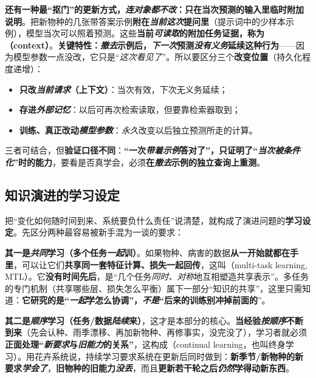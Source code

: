 \textbf{还有一种最“抠门”的更新方式，\emph{连对象都不改}：只在当次预测的输入里临时附加说明}。把新物种的几张带答案示例\textbf{附在\emph{当前这次}提问里}（提示词中的少样本示例），模型当次可以照着预测。这些\textbf{当前\emph{可读取}的附加任务证据，称为（context）}。\textbf{关键特性：\emph{撤去}示例后，\emph{下一次}预测\emph{没有义务}延续这种行为}——因为模型参数一点没改，它只是“\emph{这次看见了}”。所以要区分三个\textbf{改变位置}（持久化程度递增）：
\begin{itemize}\item \textbf{只改\emph{当前请求}（上下文）}：当次有效，下次无义务延续；\item \textbf{存进\emph{外部记忆}}：以后可再次检索读取，但要靠检索器取到；\item \textbf{训练、真正改动\emph{模型参数}}：\emph{永久}改变以后独立预测所走的计算。\end{itemize}
三者可结合，但\textbf{验证口径不同}：\textbf{“一次\emph{带着示例}答对了”，只证明了“\emph{当次被条件化}”时的能力}，要看是否真学会，必须\textbf{在\emph{撤去}示例的独立查询上重测}。

\subsection{知识演进的学习设定}
\label{sec:ket-overview-learning-settings}

把“变化如何随时间到来、系统要负什么责任”说清楚，就构成了演进问题的\textbf{学习设定}。先区分两种最容易被新手混为一谈的要求：

\textbf{其一是\emph{共同}学习（多个任务\emph{一起}训）}。如果物种、病害的数据\textbf{从一开始就都在手里}，可以让它们\textbf{共享同一套特征计算、损失一起回传}，这叫（multi-task learning, MTL）。它\textbf{没有时间先后}，是“几个任务\emph{同时、对称}地互相塑造共享表示”。多任务的专门机制（共享哪些层、损失怎么平衡）属下一部分“知识的共享”，这里只需知道：\textbf{它研究的是“\emph{一起}学怎么协调”，\emph{不是}“后来的训练别冲掉前面的}”。

\textbf{其二是\emph{顺序}学习（任务/数据\emph{陆续}来）}，这才是本部分的核心。\textbf{当经验\emph{按顺序}不断到来}（先会认种、雨季漂移、再加新物种、再修事实，没完没了），学习者就必须\textbf{正面处理“\emph{新要求}与\emph{旧能力}的关系”}，这构成（continual learning，也叫终身学习）。用花卉系统说，持续学习要求系统在更新后同时做到：\textbf{新季节/新物种的新要求\emph{学会了}}，\textbf{旧物种的旧能力\emph{没丢}}，而且\textbf{更新若干轮之后\emph{仍然}学得动新东西}。


